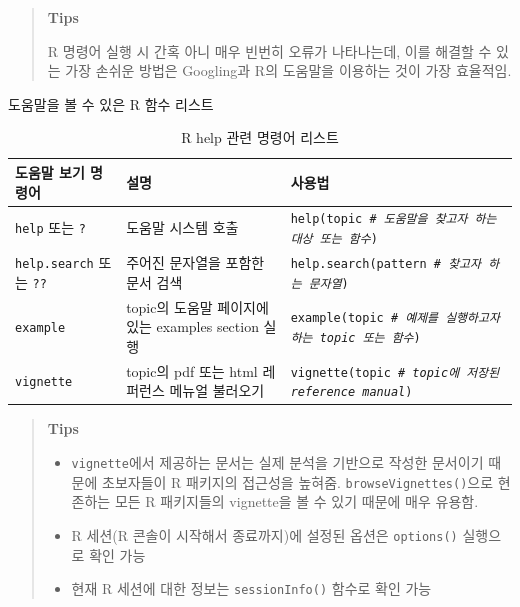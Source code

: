 \documentclass[12pt,a4paper]{book}
\theoremstyle{definition}
\theoremstyle{definition}
\theoremstyle{definition}
\theoremstyle{remark}
\begin{document}
\begin{quote}
\colorbox{gray!10}{\begin{minipage}{15cm}
\textbf{Tips}

R 명령어 실행 시 간혹 아니 매우 빈번히 오류가 나타나는데, 이를 해결할 수 있는 가장 손쉬운 방법은 Googling과 R의 도움말을 이용하는 것이 가장 효율적임. 
\end{minipage}}
\end{quote}

도움말을 볼 수 있은 R 함수 리스트

\begin{table}[H]
  \centering
  \begingroup\footnotesize
  \caption{R help 관련 명령어 리스트}
  \begin{tabular}{p{3cm}p{5cm}p{7cm}}
  \toprule
  \textbf{도움말 보기 명령어} & \textbf{설명} & \textbf{사용법} \\
  \midrule
  \texttt{help} 또는 \texttt{?}          & 도움말 시스템 호출               & \texttt{help(topic \textit{\# 도움말을 찾고자 하는 대상 또는 함수}) }\\
  \texttt{help.search} 또는 \texttt{??}  & 주어진 문자열을 포함한 문서 검색 & \texttt{help.search(pattern \textit{\# 찾고자 하는 문자열})} \\ 
  \texttt{example}                       & topic의 도움말 페이지에 있는 examples section 실행 & \texttt{example(topic \textit{\# 예제를 실행하고자 하는 topic 또는 함수})} \\
  \texttt{vignette}                      & topic의 pdf 또는 html 레퍼런스 메뉴얼 불러오기 & \texttt{vignette(topic \textit{\# topic에 저장된 reference manual})} \\
  \bottomrule
  \end{tabular}
  \endgroup
\end{table}

\begin{quote}
\colorbox{gray!10}{\begin{minipage}{15cm}
\textbf{Tips}
\begin{itemize}
\item \texttt{vignette}에서 제공하는 문서는 실제 분석을 기반으로 작성한 문서이기 때문에 초보자들이 R 패키지의 접근성을 높혀줌. \texttt{browseVignettes()}으로 현존하는 모든 R 패키지들의 vignette을 볼 수 있기 때문에 매우 유용함.
\item R 세션(R 콘솔이 시작해서 종료까지)에 설정된 옵션은 \texttt{options()} 실행으로 확인 가능
\item 현재 R 세션에 대한 정보는 \texttt{sessionInfo()} 함수로 확인 가능
\end{itemize}
\end{minipage}}
\end{quote}
\end{document}
